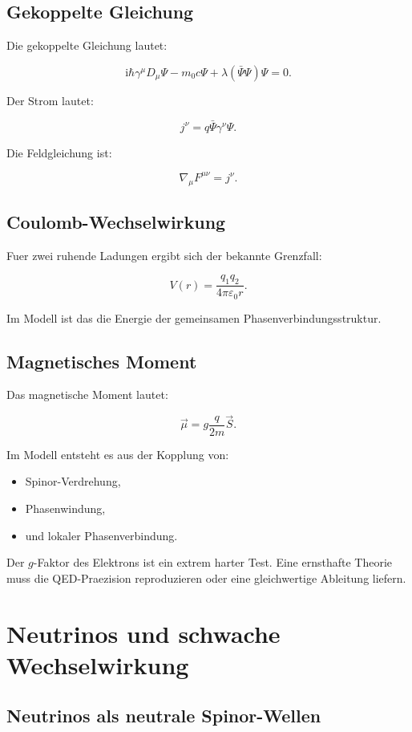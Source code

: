 \documentclass[11pt,a4paper]{article}
\newcommand{\ii}{\mathrm{i}}
\begin{document}
\subsection{Gekoppelte Gleichung}

Die gekoppelte Gleichung lautet:

\[
\ii\hbar\gamma^\mu D_\mu\Psi
-
m_0c\Psi
+
\lambda(\bar{\Psi}\Psi)\Psi
=0.
\]

Der Strom lautet:

\[
j^\nu = q\bar{\Psi}\gamma^\nu\Psi.
\]

Die Feldgleichung ist:

\[
\nabla_\mu F^{\mu\nu}=j^\nu.
\]

\subsection{Coulomb-Wechselwirkung}

Fuer zwei ruhende Ladungen ergibt sich der bekannte Grenzfall:

\[
V(r)=\frac{q_1q_2}{4\pi\varepsilon_0 r}.
\]

Im Modell ist das die Energie der gemeinsamen Phasenverbindungsstruktur.

\subsection{Magnetisches Moment}

Das magnetische Moment lautet:

\[
\vec{\mu}=g\frac{q}{2m}\vec{S}.
\]

Im Modell entsteht es aus der Kopplung von:
\begin{itemize}
  \item Spinor-Verdrehung,
  \item Phasenwindung,
  \item und lokaler Phasenverbindung.
\end{itemize}

Der $g$-Faktor des Elektrons ist ein extrem harter Test. Eine ernsthafte Theorie muss die QED-Praezision
reproduzieren oder eine gleichwertige Ableitung liefern.

\section{Neutrinos und schwache Wechselwirkung}

\subsection{Neutrinos als neutrale Spinor-Wellen}
\end{document}
